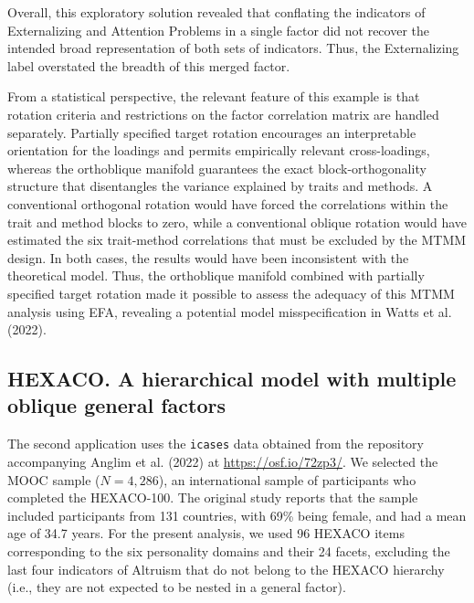 \documentclass[
  12pt,
  letterpaper,
  article]{scrartcl}
\begin{document}
Overall, this exploratory solution revealed that conflating the
indicators of Externalizing and Attention Problems in a single factor
did not recover the intended broad representation of both sets of
indicators. Thus, the Externalizing label overstated the breadth of this
merged factor.

From a statistical perspective, the relevant feature of this example is
that rotation criteria and restrictions on the factor correlation matrix
are handled separately. Partially specified target rotation encourages
an interpretable orientation for the loadings and permits empirically
relevant cross-loadings, whereas the orthoblique manifold guarantees the
exact block-orthogonality structure that disentangles the variance
explained by traits and methods. A conventional orthogonal rotation
would have forced the correlations within the trait and method blocks to
zero, while a conventional oblique rotation would have estimated the six
trait-method correlations that must be excluded by the MTMM design. In
both cases, the results would have been inconsistent with the
theoretical model. Thus, the orthoblique manifold combined with
partially specified target rotation made it possible to assess the
adequacy of this MTMM analysis using EFA, revealing a potential model
misspecification in Watts et al. (2022).

\subsection{HEXACO. A hierarchical model with multiple oblique general
factors}\label{hexaco.-a-hierarchical-model-with-multiple-oblique-general-factors}

The second application uses the \texttt{icases} data obtained from the
repository accompanying Anglim et al. (2022) at
\url{https://osf.io/72zp3/}. We selected the MOOC sample (\(N=4,286\)),
an international sample of participants who completed the HEXACO-100.
The original study reports that the sample included participants from
131 countries, with 69\% being female, and had a mean age of 34.7 years.
For the present analysis, we used 96 HEXACO items corresponding to the
six personality domains and their 24 facets, excluding the last four
indicators of Altruism that do not belong to the HEXACO hierarchy (i.e.,
they are not expected to be nested in a general factor).
\end{document}
